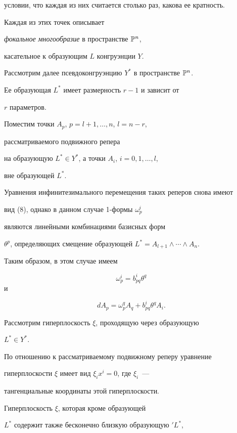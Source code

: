 условии, что каждая из них считается столько раз, какова ее кратность.


 Каждая из этих точек описывает


{\it фокальное многообразие} в пространстве $\Bbb{P}^n$,


касательное к образующим $L$ конгруэнции $Y$.






Рассмотрим далее псевдоконгруэнцию $Y^*$ в пространстве $\Bbb{P}^n$.


Ее образующая $L^*$ имеет размерность $r - 1$ и зависит от


$r$ параметров.


 Поместим точки $A_p$, $p= l + 1, \dotsc , n$, $l = n - r$,


рассматриваемого подвижного репера


на образующую $L^* \in Y^*$, а точки $A_i$, $ i = 0, 1, \dotsc , l$,


вне образующей $L^*$.


Уравнения инфинитезимального перемещения таких реперов снова имеют


вид (8), однако в данном случае 1-формы $\omega_p^i$


являются линейными комбинациями базисных форм


$\theta^p$, определяющих смещение образующей $L^* = A_{l+1}


\wedge \dotsb \wedge A_n$.


Таким образом, в этом случае имеем


$$


\omega_p^i = b_{pq}^i \theta^q


$$
и


\begin{equation}\label{22}
dA_p = \omega_p^q A_q + b_{pq}^i \theta^q A_i.
\end{equation}

Рассмотрим гиперплоскость $\xi$, проходящую через образующую


$L^* \in Y^*$.


 По отношению к рассматриваемому подвижному реперу уравнение


гиперплоскости $\xi$ имеет вид $\xi_i x^i = 0$, где $\xi_i$~---


тангенциальные координаты этой гиперплоскости.


 Гиперплоскость $\xi$, которая кроме образующей


$L^*$ содержит также бесконечно близкую образующую ${}'L^*$,


